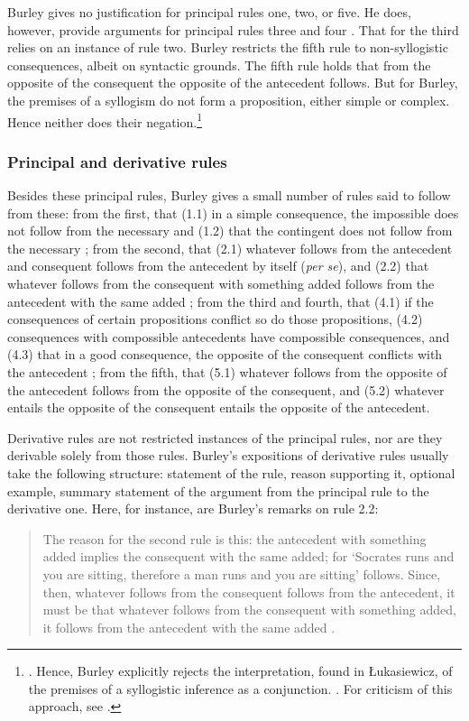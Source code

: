 	Burley gives no justification for principal rules one, two, or five. He does, however, provide arguments for principal rules three and four \autocite[p. 63.1-14]{BurleyDPAL}. That for the third relies on an instance of rule two. Burley restricts the fifth rule to non-syllogistic consequences, albeit on syntactic grounds. The fifth rule holds that from the opposite of the consequent the opposite of the antecedent follows. But for Burley, the premises of a syllogism do not form a proposition, either simple or complex. Hence neither does their negation.\footnote{\cite[pp. 65.3-17; 207.31-208.9]{BurleyDPAL}. Hence, Burley explicitly rejects the interpretation, found in \L{}ukasiewicz, of the premises of a syllogistic inference as a conjunction. \cite{Lukasiewicz1957}. For criticism of this approach, see \cite{Corcoran1974}.}
	
	\subsubsection{Principal and derivative rules}
	Besides these principal rules, Burley gives a small number of rules said to follow from these: from the first, that (1.1) in a simple consequence, the impossible does not follow from the necessary and (1.2) that the contingent does not follow from the necessary \autocite[p. 62.1-8]{BurleyDPAL}; from the second, that (2.1) whatever follows from the antecedent and consequent follows from the antecedent by itself (\textit{per se}), and (2.2) that whatever follows from the consequent with something added follows from the antecedent with the same added \autocite[p. 62.22-38]{BurleyDPAL}; from the third and fourth, that (4.1) if the consequences of certain propositions conflict so do those propositions, (4.2) consequences with compossible antecedents have compossible consequences, and (4.3) that in a good consequence, the opposite of the consequent conflicts with the antecedent \autocite[pp. 63.15-64.7]{BurleyDPAL}; from the fifth, that (5.1) whatever follows from the opposite of the antecedent follows from the opposite of the consequent, and (5.2) whatever entails the opposite of the consequent entails the opposite of the antecedent.
	
	Derivative rules are not restricted instances of the principal rules, nor are they derivable solely from those rules. Burley's expositions of derivative rules usually take the following structure: statement of the rule, reason supporting it, optional example, summary statement of the argument from the principal rule to the derivative one. Here, for instance, are Burley's remarks on rule 2.2: 
	\begin{quote}
		The reason for the second rule is this: the antecedent with something added implies the consequent with the same added; for `Socrates runs and you are sitting, therefore a man runs and you are sitting' follows. Since, then, whatever follows from the consequent follows from the antecedent, it must be that whatever follows from the consequent with something added, it follows from the antecedent with the same added \autocite[p. 62.33-38]{BurleyDPAL}.
	\end{quote}
	
